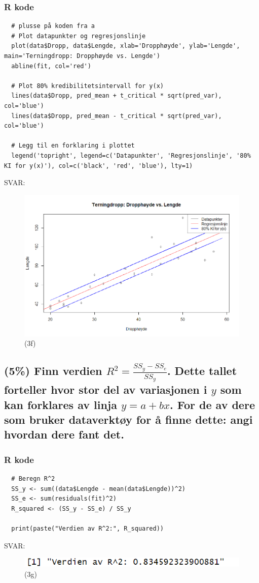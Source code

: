 \documentclass[12pt]{article}
\begin{document}
\subsubsection{R kode}
\begin{verbatim}
  # plusse på koden fra a
  # Plot datapunkter og regresjonslinje
  plot(data$Dropp, data$Lengde, xlab='Dropphøyde', ylab='Lengde', main='Terningdropp: Dropphøyde vs. Lengde')
  abline(fit, col='red')
  
  # Plot 80% kredibilitetsintervall for y(x)
  lines(data$Dropp, pred_mean + t_critical * sqrt(pred_var), col='blue')
  lines(data$Dropp, pred_mean - t_critical * sqrt(pred_var), col='blue')
  
  # Legg til en forklaring i plottet
  legend('topright', legend=c('Datapunkter', 'Regresjonslinje', '80% KI for y(x)'), col=c('black', 'red', 'blue'), lty=1)  
\end{verbatim}
SVAR:
\begin{figure}[H]
  \centering
  \includegraphics[width=1\textwidth]{3f.png}
  \caption{(3f)}
\end{figure}


\subsection{(5\%) Finn verdien $R^2 = \frac{SS_y - SS_e}{SS_y}$. Dette tallet forteller hvor stor del av variasjonen i $y$ som kan forklares av linja $y = a + bx$. For de av dere som bruker dataverktøy for å finne dette: angi hvordan dere fant det.}
\subsubsection{R kode}
\begin{verbatim}
  # Beregn R^2
  SS_y <- sum((data$Lengde - mean(data$Lengde))^2)
  SS_e <- sum(residuals(fit)^2)
  R_squared <- (SS_y - SS_e) / SS_y
  
  print(paste("Verdien av R^2:", R_squared)) 
\end{verbatim}
SVAR:
\begin{figure}[H]
  \centering
  \includegraphics[width=1\textwidth]{3g.png}
  \caption{(3g)}
\end{figure}
\end{document}
